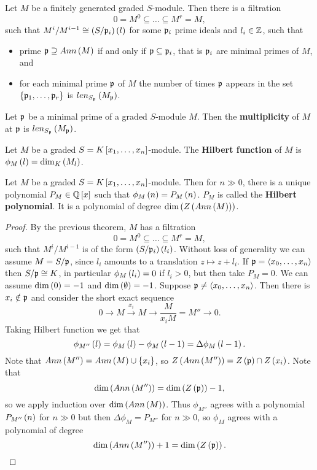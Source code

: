 \begin{theorem}
Let $ M $ be a finitely generated graded $ S $-module. Then there is a filtration
$$ 0 = M^0 \subseteq \dots \subseteq M^r = M, $$
such that $ M^i / M^{i - 1} \cong \rb{S / \pp_i}\rb{l} $ for some $ \pp_i $ prime ideals and $ l_i \in \Z $, such that
\begin{itemize}
\item prime $ \pp \supseteq Ann\rb{M} $ if and only if $ \pp \subseteq \pp_i $, that is $ \pp_i $ are minimal primes of $ M $, and
\item for each minimal prime $ \pp $ of $ M $ the number of times $ \pp $ appears in the set $ \cb{\pp_1, \dots, \pp_r} $ is $ len_{S_\pp}\rb{M_\pp} $.
\end{itemize}
\end{theorem}


\begin{definition}
Let $ \pp $ be a minimal prime of a graded $ S $-module $ M $. Then the \textbf{multiplicity} of $ M $ at $ \pp $ is $ len_{S_\pp}\rb{M_\pp} $.
\end{definition}

\begin{definition}
Let $ M $ be a graded $ S = K\sb{x_1, \dots, x_n} $-module. The \textbf{Hilbert function} of $ M $ is $ \phi_M\rb{l} = \dim_K\rb{M_l} $.
\end{definition}

\begin{theorem}
Let $ M $ be a graded $ S = K\sb{x_1, \dots, x_n} $-module. Then for $ n \gg 0 $, there is a unique polynomial $ P_M \in \Q\sb{x} $ such that $ \phi_M\rb{n} = P_M\rb{n} $. $ P_M $ is called the \textbf{Hilbert polynomial}. It is a polynomial of degree $ \dim\rb{Z\rb{Ann\rb{M}}} $.
\end{theorem}

\begin{proof}
By the previous theorem, $ M $ has a filtration
$$ 0 = M^0 \subseteq \dots \subseteq M^r = M, $$
such that $ M^i / M^{i - 1} $ is of the form $ \rb{S / \pp_i}\rb{l_i} $. Without loss of generality we can assume $ M = S / \pp $, since $ l_i $ amounts to a translation $ z \mapsto z + l_i $. If $ \pp = \ab{x_0, \dots, x_n} $ then $ S / \pp \cong K $, in particular $ \phi_M\rb{l_i} = 0 $ if $ l_i > 0 $, but then take $ P_M = 0 $. We can assume $ \dim\rb{0} = -1 $ and $ \dim\rb{\emptyset} = -1 $. Suppose $ \pp \ne \ab{x_0, \dots, x_n} $. Then there is $ x_i \notin \pp $ and consider the short exact sequence
$$ 0 \to M \xrightarrow{x_i} M \to \dfrac{M}{x_iM} = M'' \to 0. $$
Taking Hilbert function we get that
$$ \phi_{M''}\rb{l} = \phi_M\rb{l} - \phi_M\rb{l - 1} = \Delta\phi_M\rb{l - 1}. $$
Note that $ Ann\rb{M''} = Ann\rb{M} \cup \cb{x_i} $, so $ Z\rb{Ann\rb{M''}} = Z\rb{\pp} \cap Z\rb{x_i} $. Note that
$$ \dim\rb{Ann\rb{M''}} = \dim\rb{Z\rb{\pp}} - 1, $$
so we apply induction over $ \dim\rb{Ann\rb{M}} $. Thus $ \phi_{M''} $ agrees with a polynomial $ P_{M''}\rb{n} $ for $ n \gg 0 $ but then $ \Delta\phi_M = P_{M''} $ for $ n \gg 0 $, so $ \phi_M $ agrees with a polynomial of degree
$$ \dim\rb{Ann\rb{M''}} + 1 = \dim\rb{Z\rb{\pp}}. $$
\end{proof}

